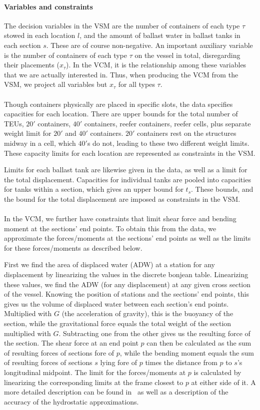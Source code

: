 \documentclass{llncs}
\begin{document}
\paragraph{Variables and constraints}
The decision variables in the VSM are the number of containers of each type $\tau$ stowed in each location $l$, and the amount of ballast water in ballast tanks in each section $s$. These are of course non-negative.
%
An important auxiliary variable is the number of containers of each type $\tau$ on the vessel in total, disregarding their placements ($x_\tau$). In the VCM, it is the relationship among these variables that we are actually interested in. Thus, when producing the VCM from the VSM, we project all variables but $x_\tau$ for all types $\tau$.  
%
\\\\
Though containers physically are placed in specific slots, the data specifies capacities for each location.
There are upper bounds for the total number of TEUs, $20'$ containers, $40'$ containers, reefer containers, reefer cells, plus {separate weight limit for $20'$ and $40'$ containers}. $20'$ containers rest on the structures midway in a cell, which $40'$s do not, leading to these two different weight limits. 
These capacity limits for each location are represented as constraints in the VSM.
%

Limits for each ballast tank are likewise given in the data, as well as a limit for the total displacement. 
Capacities for individual tanks are pooled into capacities for tanks within a section, which gives an upper bound for $t_s$. These bounds, and the bound for the total displacement are imposed as constraints in the VSM.
\\\\
In the VCM, we further have constraints that limit shear force and bending moment at the sections' end points. To obtain this from the data, we approximate the forces/moments at the sections' end points as well as the limits for these forces/moments as described below. 

First we find the area of displaced water (ADW) at a station for any displacement by linearizing the values in the discrete bonjean table. Linearizing these values, we find the ADW (for any displacement) at any given cross section of the vessel. Knowing the position of stations and the sections' end points, this gives us the volume of displaced water between each section's end points. Multiplied with $G$ (the acceleration of gravity), this is the buoyancy of the section, while the gravitational force equals the total weight of the section multiplied with $G$. Subtracting one from the other gives us the resulting force of the section. The shear force at an end point $p$ can then be calculated as the sum of resulting forces of sections fore of $p$, while the bending moment equals the sum of resulting forces of sections $s$ lying fore of $p$ times the distance from $p$ to $s$'s longitudinal midpoint.
The limit for the forces/moments at $p$ is calculated by linearizing the corresponding limits at the frame closest to $p$ at either side of it.  
A more detailed description can be found in~\cite{ICCL18} as well as a description of the accuracy of the hydrostatic approximations.
\end{document}
